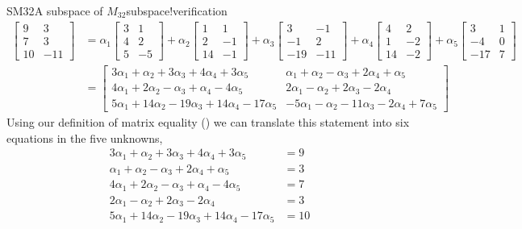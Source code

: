 \begin{example}{SM32}{A subspace of $M_{32}$}{subspace!verification}
\begin{align*}
\begin{bmatrix}
9 & 3 \\ 7&3 \\ 10 & -11
\end{bmatrix}
&=
\alpha_1
\begin{bmatrix}
3 & 1 \\ 4 & 2 \\ 5 & -5
\end{bmatrix}
+\alpha_2
\begin{bmatrix}
1 & 1 \\ 2 & -1 \\ 14 & -1
\end{bmatrix}
+\alpha_3
\begin{bmatrix}
3 & -1 \\ -1 & 2 \\ -19 & -11
\end{bmatrix}
+\alpha_4
\begin{bmatrix}
4 & 2 \\ 1 & -2 \\ 14 & -2
\end{bmatrix}
+\alpha_5
\begin{bmatrix}
3 & 1 \\ -4 & 0 \\ -17 & 7
\end{bmatrix}\\
%
&=
\begin{bmatrix}
3\alpha_1 +\alpha_2 +3\alpha_3 +4\alpha_4 +3\alpha_5 &
\alpha_1 +\alpha_2 -\alpha_3 +2\alpha_4 +\alpha_5\\
4\alpha_1 +2\alpha_2 -\alpha_3 +\alpha_4 -4\alpha_5&
2\alpha_1 -\alpha_2 +2\alpha_3 -2\alpha_4 \\
5\alpha_1 +14\alpha_2 -19\alpha_3 +14\alpha_4 -17\alpha_5&
-5\alpha_1 -\alpha_2 -11\alpha_3 -2\alpha_4 +7\alpha_5
\end{bmatrix}
\end{align*}
%
Using our definition of matrix equality () we can translate this statement into six equations in the five unknowns,
%
\begin{align*}
3\alpha_1 +\alpha_2 +3\alpha_3 +4\alpha_4 +3\alpha_5& =9\\
\alpha_1 +\alpha_2 -\alpha_3 +2\alpha_4 +\alpha_5& =3\\
4\alpha_1 +2\alpha_2 -\alpha_3 +\alpha_4 -4\alpha_5& =7\\
2\alpha_1 -\alpha_2 +2\alpha_3 -2\alpha_4 & =3\\
5\alpha_1 +14\alpha_2 -19\alpha_3 +14\alpha_4 -17\alpha_5& =10\\

\end{align*}
\end{example}
